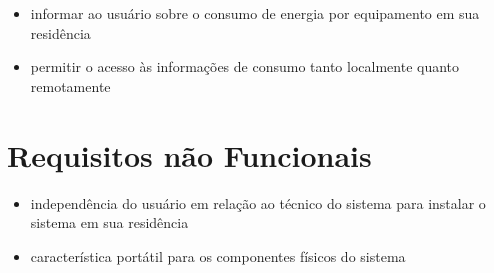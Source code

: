 \begin{itemize}
	\item{informar ao usuário sobre o consumo de energia por equipamento em sua residência}
  \item{permitir o acesso às informações de consumo tanto localmente quanto remotamente}
\end{itemize}

\section{Requisitos não Funcionais}

\begin{itemize}
	\item{independência do usuário em relação ao técnico do sistema para instalar o sistema em sua residência}
	\item{característica portátil para os componentes físicos do sistema}
\end{itemize}


